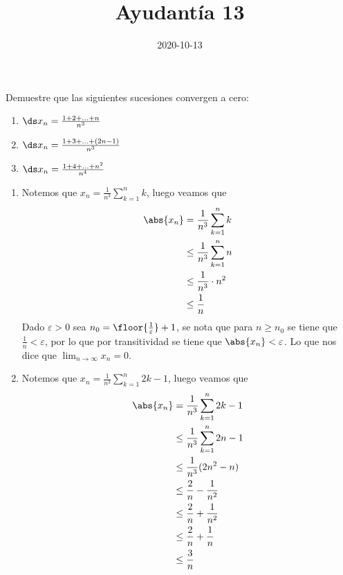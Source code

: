 \documentclass{ayudantia}
\title{Ayudantía 13}
\date{2020-10-13}
\begin{document}
\maketitle


\begin{prob}
    Demuestre que las siguientes sucesiones convergen a cero:
    \begin{enumerate}
        \item \(\ds x_n=\frac{1+2+\ldots+n}{n^3}\)
        \item \(\ds x_n=\frac{1+3+\ldots+(2n-1)}{n^3}\)
        \item \(\ds x_n=\frac{1+4+\ldots+n^2}{n^4}\)
    \end{enumerate}
\end{prob}

\begin{ans}
    \begin{sol}
        \begin{enumerate}
            \item Notemos que \(x_n=\frac1{n^3}\sum_{k=1}^nk\), luego veamos que
            \begin{align*}
                \abs{x_n}&=\frac1{n^3}\sum_{k=1}^{n}k\\
                &\leq \frac1{n^3}\sum_{k=1}^{n}n\\
                &\leq \frac1{n^3}\cdot n^2\\
                &\leq \frac1n\\
            \end{align*}
            Dado \(\varepsilon>0\) sea \(n_0=\floor{\frac1\varepsilon}+1\), se nota que para \(n\geq n_0\) se tiene que \(\frac1n<\varepsilon\), por lo que por transitividad se tiene que \(\abs{x_n}<\varepsilon\). Lo que nos dice que \(\lim_{n\rightarrow\infty}x_n=0\).
            \item Notemos que \(x_n=\frac1{n^3}\sum_{k=1}^n2k-1\), luego veamos que
            \begin{align*}
                \abs{x_n}&=\frac1{n^3}\sum_{k=1}^n2k-1\\
                &\leq\frac1{n^3}\sum_{k=1}^n2n-1\\
                &\leq\frac1{n^3}(2n^2-n)\\
                &\leq\frac2n-\frac1{n^2}\\
                &\leq\frac2n+\frac1{n^2}\\
                &\leq\frac2n+\frac1n\\
                &\leq\frac3n\\

\end{align*}
\end{enumerate}
\end{sol}
\end{ans}
\end{document}
